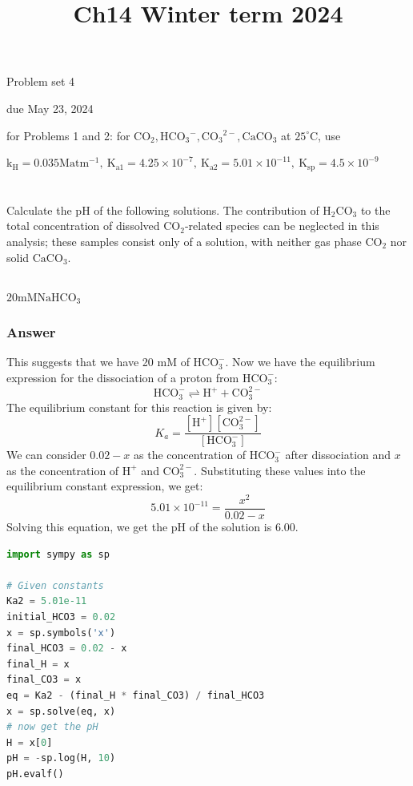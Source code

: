 \documentclass[12pt]{article}
\title{Ch14 Winter term 2024 }
\author{}
\date{}
\begin{document}
\maketitle
Problem set 4

due May 23, 2024

for Problems 1 and 2: for $\mathrm{CO}_{2}, \mathrm{HCO}_{3}{ }^{-}, \mathrm{CO}_{3}{ }^{2-}, \mathrm{CaCO}_{3}$ at $25^{\circ} \mathrm{C}$, use

$\mathrm{k}_{\mathrm{H}}=0.035 \mathrm{M} \mathrm{atm}^{-1}, \mathrm{~K}_{\mathrm{a} 1}=4.25 \times 10^{-7}, \mathrm{~K}_{\mathrm{a} 2}=5.01 \times 10^{-11}, \mathrm{~K}_{\mathrm{sp}}=4.5 \times 10^{-9}$

\section{}
Calculate the $\mathrm{pH}$ of the following solutions. The contribution of $\mathrm{H}_{2} \mathrm{CO}_{3}$ to the total concentration of dissolved $\mathrm{CO}_{2}$-related species can be neglected in this analysis; these samples consist only of a solution, with neither gas phase $\mathrm{CO}_{2}$ nor solid $\mathrm{CaCO}_{3}$.

\subsection{}
$20 \mathrm{mM} \mathrm{NaHCO_3}$
\subsubsection{Answer}
This suggests that we have 20 mM of $\mathrm{HCO}_{3}^{-}$. Now we have the equilibrium expression for the dissociation of a proton from $\mathrm{HCO}_{3}^{-}$:
\begin{equation}
\mathrm{HCO}_{3}^{-} \rightleftharpoons \mathrm{H}^{+}+\mathrm{CO}_{3}^{2-}
\end{equation}
The equilibrium constant for this reaction is given by:
\begin{equation}
K_{a}=\frac{[\mathrm{H}^{+}][\mathrm{CO}_{3}^{2-}]}{[\mathrm{HCO}_{3}^{-}]}
\end{equation}
We can consider $0.02 -x $ as the concentration of $\mathrm{HCO}_{3}^{-}$ after dissociation and $x$ as the concentration of $\mathrm{H}^{+}$ and $\mathrm{CO}_{3}^{2-}$. Substituting these values into the equilibrium constant expression, we get:
\begin{equation}
5.01 \times 10^{-11}=\frac{x^{2}}{0.02-x}
\end{equation}
Solving this equation, we get the $\mathrm{pH}$ of the solution is $6.00$.
\begin{lstlisting}[language=Python]
import sympy as sp

# Given constants
Ka2 = 5.01e-11
initial_HCO3 = 0.02
x = sp.symbols('x')
final_HCO3 = 0.02 - x
final_H = x
final_CO3 = x
eq = Ka2 - (final_H * final_CO3) / final_HCO3
x = sp.solve(eq, x)
# now get the pH
H = x[0]
pH = -sp.log(H, 10)
pH.evalf()

\end{lstlisting}
\end{document}
